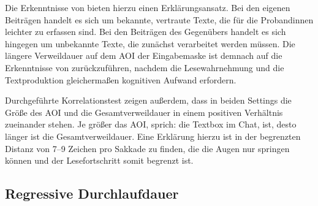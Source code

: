Die Erkenntnisse von \citet[]{jakobsen_chapter_2017} bieten hierzu einen Erklärungsansatz. Bei den eigenen Beiträgen handelt es sich um bekannte, vertraute Texte, die für die Proband{\textperiodcentered}innen leichter zu erfassen sind. Bei den Beiträgen des Gegenübers handelt es sich hingegen um unbekannte Texte, die zunächst verarbeitet werden müssen. Die längere Verweildauer auf dem AOI der Eingabemaske ist demnach auf die Erkenntnisse von \citet[]{jakobsen_chapter_2017} zurückzuführen, nachdem die Lesewahrnehmung und die Textproduktion gleichermaßen kognitiven Aufwand erfordern. 

Durchgeführte Korrelationstest zeigen außerdem, dass in beiden Settings die Größe des AOI und die Gesamtverweildauer in einem positiven Verhältnis zueinander stehen. Je größer das AOI, sprich: die Textbox im Chat, ist, desto länger ist die Gesamtverweildauer. Eine Erklärung hierzu ist in der begrenzten Distanz von 7--9 Zeichen pro Sakkade zu finden, die die Augen nur springen können und der Lesefortschritt somit begrenzt ist.



\subsection{Regressive Durchlaufdauer}
\label{K7:subsec:iaregpd}


